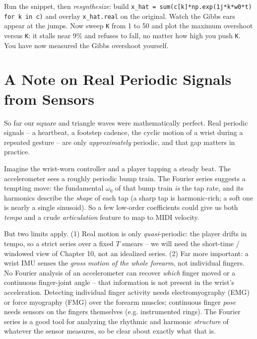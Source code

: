 \begin{labbox}
Run the snippet, then \emph{resynthesize}: build
\texttt{x\_hat = sum(c[k]*np.exp(1j*k*w0*t) for k in c)} and overlay
\texttt{x\_hat.real} on the original. Watch the Gibbs ears appear at the jumps. Now sweep
\texttt{K} from 1 to 50 and plot the maximum overshoot versus \texttt{K}: it stalls near
$9\%$ and refuses to fall, no matter how high you push \texttt{K}. You have now measured
the Gibbs overshoot yourself.
\end{labbox}

\section{A Note on Real Periodic Signals from Sensors}

So far our square and triangle waves were mathematically perfect. Real periodic signals --
a heartbeat, a footstep cadence, the cyclic motion of a wrist during a repeated gesture --
are only \emph{approximately} periodic, and that gap matters in practice.

\begin{goalbox}
Imagine the wrist-worn controller and a player tapping a steady beat. The accelerometer
sees a roughly periodic bump train. The Fourier series suggests a tempting move: the
fundamental \(\omega_0\) of that bump train \emph{is} the tap rate, and its harmonics
describe the \emph{shape} of each tap (a sharp tap is harmonic-rich; a soft one is nearly
a single sinusoid). So a few low-order coefficients could give us both \emph{tempo} and a
crude \emph{articulation} feature to map to MIDI velocity.

But two limits apply. (1) Real motion is only \emph{quasi}-periodic: the player
drifts in tempo, so a strict series over a fixed \(T\) smears -- we will need the
short-time / windowed view of Chapter 10, not an idealized series. (2) Far more important:
a wrist IMU senses the \emph{gross motion of the whole forearm}, not individual fingers.
No Fourier analysis of an accelerometer can recover \emph{which} finger moved or a
continuous finger-joint angle -- that information is not present in the wrist's
acceleration. Detecting individual finger activity needs electromyography (EMG) or force
myography (FMG) over the forearm muscles; continuous finger \emph{pose} needs sensors on
the fingers themselves (e.g. instrumented rings). The Fourier series is a good tool for
analyzing the rhythmic and harmonic \emph{structure} of whatever the sensor measures, so
be clear about exactly what that is.
\end{goalbox}

